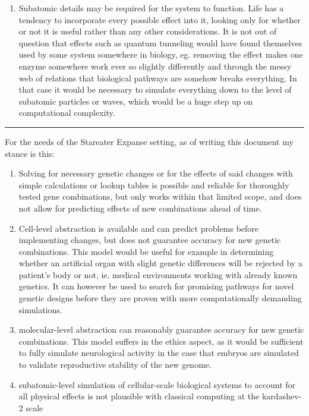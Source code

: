 \documentclass[a4paper]{article}
\begin{document}
\begin{enumerate}
		\item Subatomic details may be required for the system to function. Life has a tendency to incorporate every possible effect into it, looking only for whether or not it is useful rather than any other considerations. It is not out of question that effects such as quantum tunneling would have found themselves used by some system somewhere in biology, eg. removing the effect makes one enzyme somewhere work ever so slightly differently and through the messy web of relations that biological pathways are somehow breaks everything. In that case it would be necessary to simulate everything down to the level of subatomic particles or waves, which would be a huge step up on computational complexity.
	\end{enumerate}
	
	\medskip
	
	\noindent\rule{\linewidth}{1pt}
	
	\medskip
	
	For the needs of the Stareater Expanse setting, as of writing this document my stance is this:
	
	\begin{enumerate}
		\item Solving for necessary genetic changes or for the effects of said changes with simple calculations or lookup tables is possible and reliable for thoroughly tested gene combinations, but only works within that limited scope, and does not allow for predicting effects of new combinations ahead of time.
		
		\item Cell-level abstraction is available and can predict problems before implementing changes, but does not guarantee accuracy for new genetic combinations. This model would be useful for example in determining whether an artificial organ with slight genetic differences will be rejected by a patient's body or not, ie. medical environments working with already known genetics. It can however be used to search for promising pathways for novel genetic designs before they are proven with more computationally demanding simulations.
		
		\item molecular-level abstraction can reasonably guarantee accuracy for new genetic combinations. This model suffers in the ethics aspect, as it would be sufficient to fully simulate neurological activity in the case that embryos are simulated to validate reproductive stability of the new genome.
		
		\item subatomic-level simulation of cellular-scale biological systems to account for all physical effects is not plausible with classical computing at the kardashev-2 scale
	\end{enumerate}
	
\end{document}
